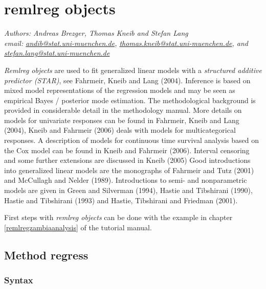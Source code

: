 \chapter{remlreg objects}\normalsize
\label{remlreg} 

{\em Authors: Andreas Brezger, Thomas Kneib and Stefan Lang} \\
{\em email:
\href{mailto:andib@stat.uni-muenchen.de}{andib@stat.uni-muenchen.de},
\href{mailto:thomas.kneib@stat.uni-muenchen.de}{thomas.kneib@stat.uni-muenchen.de},
and\newline
\href{mailto:stefan.lang@stat.uni-muenchen.de}{stefan.lang@stat.uni-muenchen.de}} \\
\vspace{0.3cm}

{\em Remlreg objects} are used to fit generalized linear models with
a {\em structured additive predictor (STAR)}, see Fahrmeir, Kneib
and Lang (2004). Inference is based on mixed model representations
of the regression models and may be seen as empirical Bayes /
posterior mode estimation. The methodological background is provided
in considerable detail in the methodology manual. More details on
models for univariate responses can be found in Fahrmeir, Kneib and
Lang (2004), Kneib and Fahrmeir (2006) deals with models for
multicategorical responses. A description of models for continuous
time survival analysis based on the Cox model can be found in Kneib
and Fahrmeir (2006). Interval censoring and some further extensions
are discussed in Kneib (2005) Good introductions into generalized
linear models are the monographs of Fahrmeir and Tutz (2001) and
McCullagh and Nelder (1989). Introductions to semi- and
nonparametric models are given in Green and Silverman (1994), Hastie
and Tibshirani (1990), Hastie and Tibshirani (1993) and Hastie,
Tibshirani and Friedman (2001).

First steps with {\em remlreg objects} can be done with the example
in chapter \ref*{remlregzambiaanalysis} of the tutorial manual.

\section{Method regress}
\label{remlregregress}

\subsection{Syntax}
\label{remlregregresssyntax}


